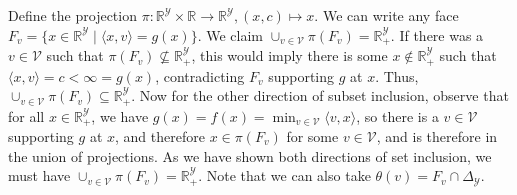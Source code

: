 \documentclass[11pt]{article}
\newcommand{\reals}{\mathbb{R}}
\newcommand{\simplex}{\Delta_\Y}
\newcommand{\V}{\mathcal{V}}
\newcommand{\Y}{\mathcal{Y}}
\newcommand{\inprod}[2]{\langle #1, #2 \rangle}%
\begin{document}
Define the projection $\pi:\reals^\Y\times \reals \to \reals^\Y, (x,c) \mapsto x$.
We can write any face $F_v = \{x \in \reals^\Y \mid \inprod{x}{v} = g(x)\}$.
We claim $\cup_{v \in \V}\pi(F_v) = \reals_+^\Y$.
If there was a $v \in \V$ such that $\pi(F_v) \not \subseteq \reals_+^\Y$, this would imply there is some $x \not \in \reals_+^\Y$ such that $\inprod{x}{v} = c < \infty = g(x)$, contradicting $F_v$ supporting $g$ at $x$.
Thus, $\cup_{v \in \V} \pi(F_v) \subseteq \reals_+^\Y$.
Now for the other direction of subset inclusion, observe that for all $x \in \reals^\Y_+$, we have $g(x) = f(x) = \min_{v \in \V}\inprod{v}{x}$, so there is a $v \in \V$ supporting $g$ at $x$, and therefore $x \in \pi(F_v)$ for some $v \in \V$, and is therefore in the union of projections.
As we have shown both directions of set inclusion, we must have $\cup_{v \in \V}\pi(F_v) = \reals_+^\Y$.
Note that we can also take $\theta(v) = F_v \cap \simplex$.
\end{document}
